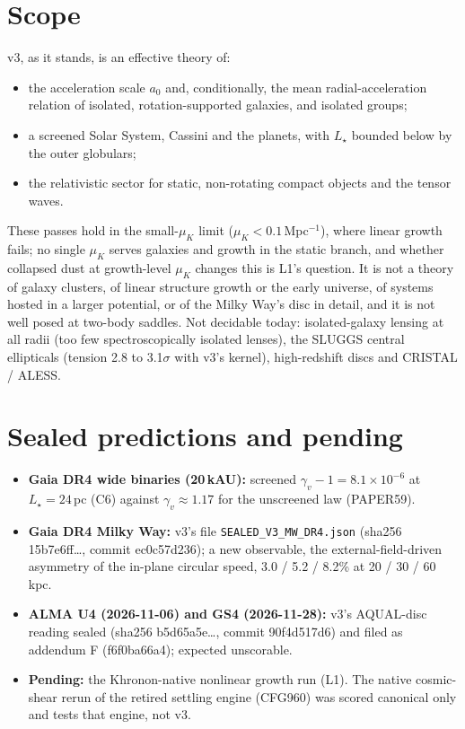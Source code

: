 \documentclass[10pt]{article}
\begin{document}
\section{Scope}
v3, as it stands, is an effective theory of:
\begin{itemize}
\item the acceleration scale $a_0$ and, conditionally, the mean radial-acceleration relation of isolated, rotation-supported galaxies, and isolated groups;
\item a screened Solar System, Cassini and the planets, with $L_\star$ bounded below by the outer globulars;
\item the relativistic sector for static, non-rotating compact objects and the tensor waves.
\end{itemize}
These passes hold in the small-$\mu_K$ limit ($\mu_K<0.1$\,Mpc$^{-1}$), where linear growth fails; no single $\mu_K$ serves galaxies and growth in the static branch, and whether collapsed dust at growth-level $\mu_K$ changes this is L1's question. It is not a theory of galaxy clusters, of linear structure growth or the early universe, of systems hosted in a larger potential, or of the Milky Way's disc in detail, and it is not well posed at two-body saddles. Not decidable today: isolated-galaxy lensing at all radii (too few spectroscopically isolated lenses), the SLUGGS central ellipticals (tension 2.8 to 3.1$\sigma$ with v3's kernel), high-redshift discs and CRISTAL / ALESS.

\section{Sealed predictions and pending}
\begin{itemize}
\item \textbf{Gaia DR4 wide binaries (20\,kAU):} screened $\gamma_v-1=8.1\times10^{-6}$ at $L_\star=24$\,pc (C6) against $\gamma_v\approx1.17$ for the unscreened law (PAPER59).
\item \textbf{Gaia DR4 Milky Way:} v3's file \texttt{SEALED\_V3\_MW\_DR4.json} (sha256 15b7e6ff\ldots, commit ec0c57d236); a new observable, the external-field-driven asymmetry of the in-plane circular speed, 3.0 / 5.2 / 8.2\% at 20 / 30 / 60\,kpc.
\item \textbf{ALMA U4 (2026-11-06) and GS4 (2026-11-28):} v3's AQUAL-disc reading sealed (sha256 b5d65a5e\ldots, commit 90f4d517d6) and filed as addendum F (f6f0ba66a4); expected unscorable.
\item \textbf{Pending:} the Khronon-native nonlinear growth run (L1). The native cosmic-shear rerun of the retired settling engine (CFG960) was scored canonical only and tests that engine, not v3.
\end{itemize}
\end{document}

